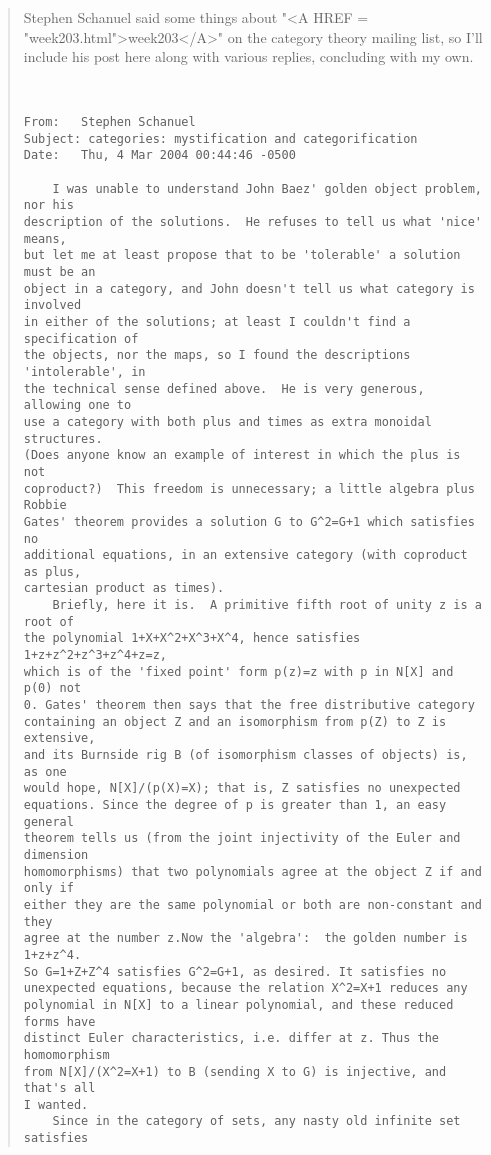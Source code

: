 \begin{quote}
Stephen Schanuel said some things about "<A HREF = "week203.html">week203</A>" on the category 
theory mailing list, so I'll include his post here along with various
replies, concluding with my own.


\begin{verbatim}


From: 	Stephen Schanuel 
Subject: categories: mystification and categorification
Date: 	Thu, 4 Mar 2004 00:44:46 -0500	

    I was unable to understand John Baez' golden object problem, nor his
description of the solutions.  He refuses to tell us what 'nice' means,
but let me at least propose that to be 'tolerable' a solution must be an
object in a category, and John doesn't tell us what category is involved
in either of the solutions; at least I couldn't find a specification of
the objects, nor the maps, so I found the descriptions 'intolerable', in
the technical sense defined above.  He is very generous, allowing one to
use a category with both plus and times as extra monoidal structures.
(Does anyone know an example of interest in which the plus is not
coproduct?)  This freedom is unnecessary; a little algebra plus Robbie
Gates' theorem provides a solution G to G^2=G+1 which satisfies no
additional equations, in an extensive category (with coproduct as plus,
cartesian product as times).
    Briefly, here it is.  A primitive fifth root of unity z is a root of
the polynomial 1+X+X^2+X^3+X^4, hence satisfies 1+z+z^2+z^3+z^4+z=z,
which is of the 'fixed point' form p(z)=z with p in N[X] and p(0) not
0. Gates' theorem then says that the free distributive category
containing an object Z and an isomorphism from p(Z) to Z is extensive,
and its Burnside rig B (of isomorphism classes of objects) is, as one
would hope, N[X]/(p(X)=X); that is, Z satisfies no unexpected
equations. Since the degree of p is greater than 1, an easy general
theorem tells us (from the joint injectivity of the Euler and dimension
homomorphisms) that two polynomials agree at the object Z if and only if
either they are the same polynomial or both are non-constant and they
agree at the number z.Now the 'algebra':  the golden number is 1+z+z^4.
So G=1+Z+Z^4 satisfies G^2=G+1, as desired. It satisfies no
unexpected equations, because the relation X^2=X+1 reduces any
polynomial in N[X] to a linear polynomial, and these reduced forms have
distinct Euler characteristics, i.e. differ at z. Thus the homomorphism
from N[X]/(X^2=X+1) to B (sending X to G) is injective, and that's all
I wanted.
    Since in the category of sets, any nasty old infinite set satisfies

\end{verbatim}
\end{quote}
